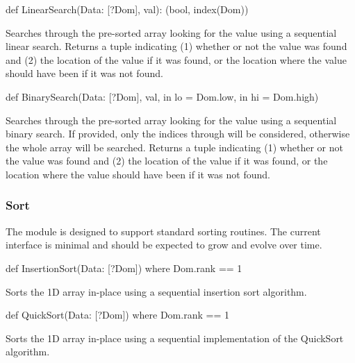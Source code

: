 \begin{protohead}
def LinearSearch(Data: [?Dom], val): (bool, index(Dom))
\end{protohead}
\begin{protobody}
Searches through the pre-sorted array  looking for the
value  using a sequential linear search.  Returns a tuple
indicating (1) whether or not the value was found and (2) the location
of the value if it was found, or the location where the value should
have been if it was not found.
\end{protobody}


\begin{protohead}
def BinarySearch(Data: [?Dom], val, in lo = Dom.low, in hi = Dom.high)
\end{protohead}
\begin{protobody}
Searches through the pre-sorted array  looking for the
value  using a sequential binary search.  If provided, only
the indices  through  will be considered, otherwise
the whole array will be searched.  Returns a tuple indicating (1)
whether or not the value was found and (2) the location of the value
if it was found, or the location where the value should have been if
it was not found.
\end{protobody}


\subsubsection{Sort}
\label{Sort}

The  module is designed to support standard sorting
routines.  The current interface is minimal and should be expected to
grow and evolve over time.

\begin{protohead}
def InsertionSort(Data: [?Dom]) where Dom.rank == 1
\end{protohead}
\begin{protobody}
Sorts the 1D array  in-place using a sequential insertion
sort algorithm.
\end{protobody}

\begin{protohead}
def QuickSort(Data: [?Dom]) where Dom.rank == 1
\end{protohead}
\begin{protobody}
Sorts the 1D array  in-place using a sequential
implementation of the QuickSort algorithm.
\end{protobody}

